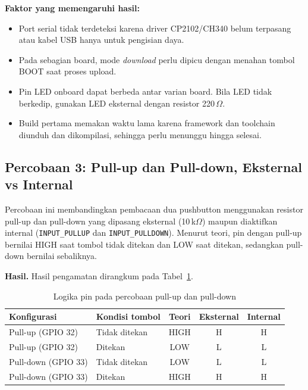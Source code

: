 \textbf{Faktor yang memengaruhi hasil:}
\begin{itemize}
  \item Port serial tidak terdeteksi karena driver CP2102/CH340 belum terpasang atau kabel USB hanya untuk pengisian daya.
  \item Pada sebagian board, mode \textit{download} perlu dipicu dengan menahan tombol BOOT saat proses upload.
  \item Pin LED onboard dapat berbeda antar varian board. Bila LED tidak berkedip, gunakan LED eksternal dengan resistor 220\,$\Omega$.
  \item Build pertama memakan waktu lama karena framework dan toolchain diunduh dan dikompilasi, sehingga perlu menunggu hingga selesai.
\end{itemize}

\subsection{Percobaan 3: Pull-up dan Pull-down, Eksternal vs Internal}

Percobaan ini membandingkan pembacaan dua pushbutton menggunakan resistor pull-up dan pull-down yang dipasang eksternal (10\,k$\Omega$) maupun diaktifkan internal (\texttt{INPUT\_PULLUP} dan \texttt{INPUT\_PULLDOWN}). Menurut teori, pin dengan pull-up bernilai HIGH saat tombol tidak ditekan dan LOW saat ditekan, sedangkan pull-down bernilai sebaliknya.

\textbf{Hasil.} Hasil pengamatan dirangkum pada Tabel~\ref{tab:p3}.

\begin{table}[H]
  \centering
  \caption{Logika pin pada percobaan pull-up dan pull-down}
  \label{tab:p3}
  \begin{tabular}{|l|l|c|c|c|}
    \hline
    Konfigurasi & Kondisi tombol & Teori & Eksternal & Internal \\
    \hline
    Pull-up (GPIO 32)   & Tidak ditekan & HIGH & H & H \\
    Pull-up (GPIO 32)   & Ditekan       & LOW  & L & L \\
    Pull-down (GPIO 33) & Tidak ditekan & LOW  & L & L \\
    Pull-down (GPIO 33) & Ditekan       & HIGH & H & H \\
    \hline
  \end{tabular}
\end{table}

